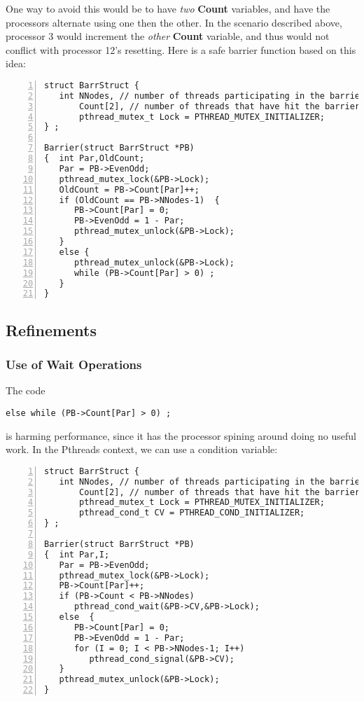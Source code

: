 One way to avoid this would be to have \textit{two} {\bf Count}
variables, and have the processors alternate using one then the other.
In the scenario described above, processor 3 would increment the
\textit{other} {\bf Count} variable, and thus would not conflict with
processor 12's resetting.  Here is a safe barrier function based on this
idea:

\begin{samepage}
\begin{Verbatim}[fontsize=\relsize{-2},numbers=left]
struct BarrStruct {
   int NNodes, // number of threads participating in the barrier
       Count[2], // number of threads that have hit the barrier so far
       pthread_mutex_t Lock = PTHREAD_MUTEX_INITIALIZER;
} ;

Barrier(struct BarrStruct *PB)
{  int Par,OldCount;
   Par = PB->EvenOdd;
   pthread_mutex_lock(&PB->Lock);
   OldCount = PB->Count[Par]++;
   if (OldCount == PB->NNodes-1)  {
      PB->Count[Par] = 0;
      PB->EvenOdd = 1 - Par;
      pthread_mutex_unlock(&PB->Lock);
   }
   else {
      pthread_mutex_unlock(&PB->Lock);
      while (PB->Count[Par] > 0) ;
   }
}
\end{Verbatim}
\end{samepage}

\subsection{Refinements}

\subsubsection{Use of Wait Operations}

The code

\begin{Verbatim}[fontsize=\relsize{-2}]
else while (PB->Count[Par] > 0) ;
\end{Verbatim}

is harming performance, since it has the processor spining around doing
no useful work.  In the Pthreads context, we can use a condition
variable:

\begin{samepage}
\begin{Verbatim}[fontsize=\relsize{-2},numbers=left]
struct BarrStruct {
   int NNodes, // number of threads participating in the barrier
       Count[2], // number of threads that have hit the barrier so far
       pthread_mutex_t Lock = PTHREAD_MUTEX_INITIALIZER;
       pthread_cond_t CV = PTHREAD_COND_INITIALIZER;
} ;

Barrier(struct BarrStruct *PB)
{  int Par,I;
   Par = PB->EvenOdd;
   pthread_mutex_lock(&PB->Lock);
   PB->Count[Par]++;
   if (PB->Count < PB->NNodes)
      pthread_cond_wait(&PB->CV,&PB->Lock);
   else  {
      PB->Count[Par] = 0;
      PB->EvenOdd = 1 - Par;
      for (I = 0; I < PB->NNodes-1; I++)
         pthread_cond_signal(&PB->CV);
   }
   pthread_mutex_unlock(&PB->Lock);
}
\end{Verbatim}
\end{samepage}


